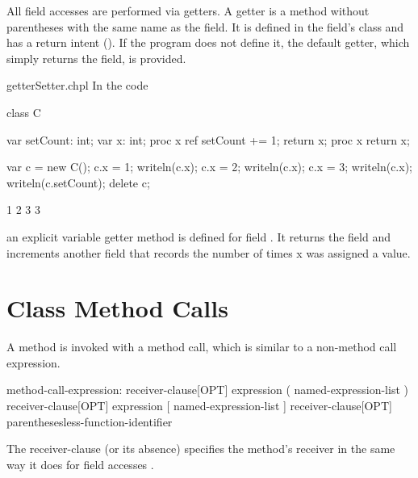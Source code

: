 All field accesses are performed via getters.  A getter is a method without
parentheses with the same name as the field. It is defined in the field's class
and has a  return intent ().  If the program
does not define it, the default getter, which simply returns the field, is
provided.

\begin{chapelexample}{getterSetter.chpl}
In the code
\begin{chapel}
class C {
  var setCount: int;
  var x: int;
  proc x ref {
    setCount += 1;
    return x;
  }
  proc x {
    return x;
  }

}
\end{chapel}
\begin{chapelpost}
var c = new C();
c.x = 1;
writeln(c.x);
c.x = 2;
writeln(c.x);
c.x = 3;
writeln(c.x);
writeln(c.setCount);
delete c;
\end{chapelpost}
\begin{chapeloutput}
1
2
3
3
\end{chapeloutput}
an explicit variable getter method is defined for field .  It
returns the field  and increments another field that records
the number of times x was assigned a value.
\end{chapelexample}

\section{Class Method Calls}
\label{Class_Method_Calls}

A method is invoked with a method call, which is similar to a non-method
call expression.

\begin{syntax}
method-call-expression:
  receiver-clause[OPT] expression ( named-expression-list )
  receiver-clause[OPT] expression [ named-expression-list ]
  receiver-clause[OPT] parenthesesless-function-identifier
\end{syntax}

The receiver-clause (or its absence) specifies the method's receiver
 in the same way it does for field accesses
.

